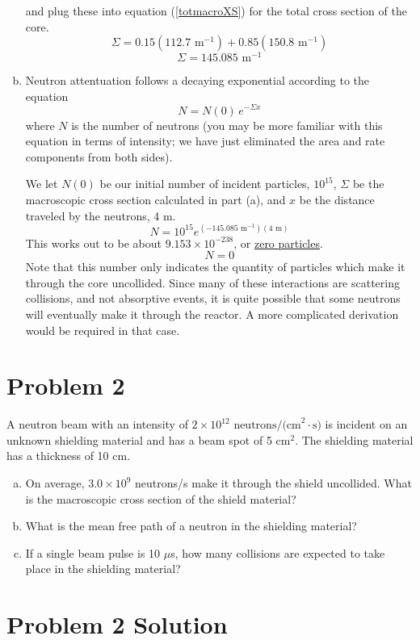 \documentclass{report}
\begin{document}
\begin{enumerate}[a)]
and plug these into equation (\ref{totmacroXS}) for the total cross section of the core.
$$ \Sigma = 0.15(112.7\text{ m}^{-1}) + 0.85(150.8\text{ m}^{-1})
 $$
$$\boxed{ \Sigma = 145.085\text{ m}^{-1} }$$

\item Neutron attentuation follows a decaying exponential according to the equation
$$ N = N(0) \, e^{-\Sigma x} $$
where $N$ is the number of neutrons (you may be more familiar with this equation in terms of intensity; we have just eliminated the area and rate components from both sides).

We let $N(0)$ be our initial number of incident particles, $10^{15}$, $\Sigma$ be the macroscopic cross section calculated in part (a), and $x$ be the distance traveled by the neutrons, 4 m.  
$$ N = 10^{15} e^{(-145.085\text{ m}^{-1})(4\text{ m})} $$
This works out to be about $9.153\times10^{-238}$, or \underline{zero particles}.
$$ N = 0 $$
Note that this number only indicates the quantity of particles which make it through the core uncollided. Since many of these interactions are scattering collisions, and not absorptive events, it is quite possible that some neutrons will eventually make it through the reactor. A more complicated derivation would be required in that case.
\end{enumerate}



\newpage
\section*{Problem 2}

A neutron beam with an intensity of $2 \times 10^{12}\text{ neutrons/(cm}^2{\cdot}\text{s)}$ is incident on an unknown shielding material and has a beam spot of 5 cm$^2$. The shielding material has a thickness of 10 cm.
\begin{enumerate}[a)]
\item On average, $3.0\times10^9$ neutrons/s make it through the shield uncollided. What is the macroscopic cross section of the shield material?
\item What is the mean free path of a neutron in the shielding material?
\item If a single beam pulse is 10 $\mu$s, how many collisions are expected to take place in the shielding material?
\end{enumerate}



\section*{Problem 2 Solution}
\end{document}
